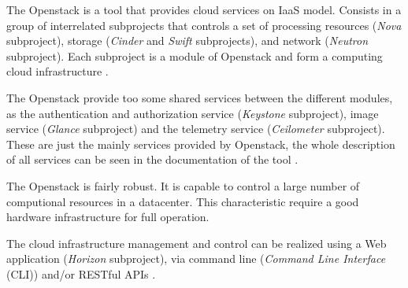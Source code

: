 \documentclass[conference]{IEEEtran}
\begin{document}
The Openstack is a tool that provides cloud services on IaaS model. Consists in a group of interrelated subprojects that controls a set of processing resources (\textit{Nova} subproject), storage (\textit{Cinder} and \textit{Swift} subprojects), and network (\textit{Neutron} subproject). Each subproject is a module of Openstack and form a computing cloud infrastructure \cite{openstack} \cite{bui2016}.


The Openstack provide too some shared services between the different modules, as the authentication and
authorization service (\textit{Keystone} subproject), image service (\textit{Glance} subproject) and the
telemetry service (\textit{Ceilometer} subproject). These are just the mainly services provided by Openstack,
the whole description of all services can be seen in the documentation of the tool \cite{openstack}.


The Openstack is fairly robust. It is capable to control a large number of computional resources
in a datacenter. This characteristic require a good hardware infrastructure for full operation.


The cloud infrastructure management and control can be realized using a Web application (\textit{Horizon} subproject), via command line (\textit{Command Line Interface} (CLI)) and/or RESTful APIs \cite{bui2016} \cite{openstack}. 
\end{document}
